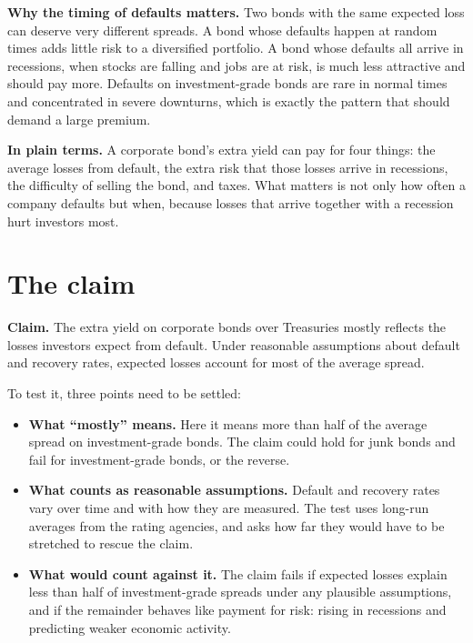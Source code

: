 \textbf{Why the timing of defaults matters.} Two bonds with the same expected loss can deserve very different spreads. A bond whose defaults happen at random times adds little risk to a diversified portfolio. A bond whose defaults all arrive in recessions, when stocks are falling and jobs are at risk, is much less attractive and should pay more. Defaults on investment-grade bonds are rare in normal times and concentrated in severe downturns, which is exactly the pattern that should demand a large premium.

\noindent\textbf{In plain terms.} A corporate bond's extra yield can pay for four things: the average losses from default, the extra risk that those losses arrive in recessions, the difficulty of selling the bond, and taxes. What matters is not only how often a company defaults but when, because losses that arrive together with a recession hurt investors most.

\section{The claim}
\label{sec:15-claim}

\begin{callout}
\textbf{Claim.} The extra yield on corporate bonds over Treasuries mostly reflects the losses investors expect from default. Under reasonable assumptions about default and recovery rates, expected losses account for most of the average spread.
\end{callout}

To test it, three points need to be settled:

\begin{itemize}
  \item \textbf{What ``mostly'' means.} Here it means more than half of the average spread on investment-grade bonds. The claim could hold for junk bonds and fail for investment-grade bonds, or the reverse.
  \item \textbf{What counts as reasonable assumptions.} Default and recovery rates vary over time and with how they are measured. The test uses long-run averages from the rating agencies, and asks how far they would have to be stretched to rescue the claim.
  \item \textbf{What would count against it.} The claim fails if expected losses explain less than half of investment-grade spreads under any plausible assumptions, and if the remainder behaves like payment for risk: rising in recessions and predicting weaker economic activity.
\end{itemize}

